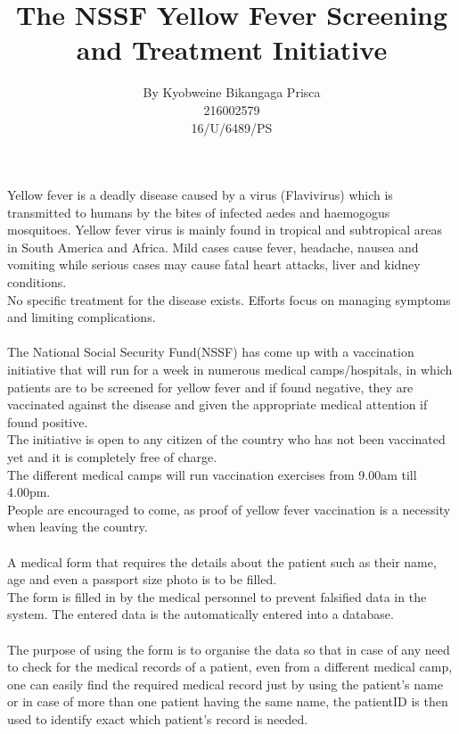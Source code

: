\documentclass[A4]{report}
\title{The NSSF Yellow Fever Screening and Treatment Initiative}
\author{By Kyobweine Bikangaga Prisca
\\
216002579
\\
16/U/6489/PS}
\begin{document}
\maketitle
Yellow fever is a deadly disease caused by a virus (Flavivirus) which is transmitted to humans by the bites of infected aedes and haemogogus mosquitoes. Yellow fever virus is mainly found in tropical and subtropical areas in South America and Africa. Mild cases cause fever, headache, nausea and vomiting while serious cases may cause fatal heart attacks, liver and kidney conditions.\\
No specific treatment for the disease exists. Efforts focus on managing symptoms and limiting complications.
\\
\\
The National Social Security Fund(NSSF) has come up with a vaccination initiative that will run for a week in numerous medical camps/hospitals, in which patients are to be screened for yellow fever and if found negative, they are vaccinated against the disease and given the appropriate medical attention if found positive.\\
The initiative is open to any citizen of the country who has not been vaccinated yet and it is completely free of charge.\\The different medical camps will run vaccination exercises from 9.00am till 4.00pm.\\
People are encouraged to come, as proof of yellow fever vaccination is a necessity when leaving the country.
\\
\\
A medical form that requires the details about the patient such as their name, age and even a passport size photo is to be filled.\\The form is filled in by the medical personnel to prevent falsified data in the system. The entered data is the automatically entered into a database.
\\
\\
The purpose of using the form is to organise the data so that in case of any need to check for the medical records of a patient, even from a different medical camp, one can easily find the required medical record just by using the patient's name or in case of more than one patient having the same name, the patientID is then used to identify exact which patient's record is needed.
 
\end{document}
